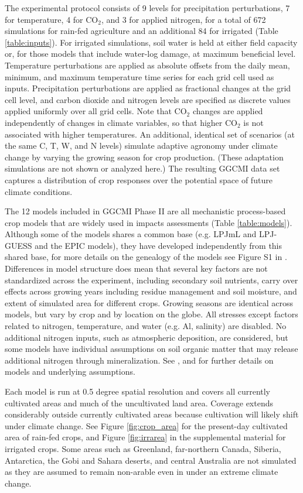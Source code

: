 \documentclass[preprint, 5p, times, twocolumn]{elsarticle}
\begin{document}
The experimental protocol consists of 9 levels for precipitation perturbations, 7 for temperature, 4 for CO$_2$, and 3 for applied nitrogen, for a total of 672 simulations for rain-fed agriculture and an additional 84 for irrigated (Table \ref{table:inputs}). For irrigated simulations, soil water is held at either field capacity or, for those models that include water-log damage, at maximum beneficial level.  Temperature perturbations are applied as absolute offsets from the daily mean, minimum, and maximum temperature time series for each grid cell used as inputs. Precipitation perturbations are applied as fractional changes at the grid cell level, and carbon dioxide and nitrogen levels are specified as discrete values applied uniformly over all grid cells. Note that CO$_2$ changes are applied independently of changes in climate variables, so that higher CO$_2$ is not associated with higher temperatures. An additional, identical set of scenarios (at the same C, T, W, and N levels) simulate adaptive agronomy under climate change by varying the growing season for crop production. (These adaptation simulations are not shown or analyzed here.) The resulting GGCMI data set captures a distribution of crop responses over the potential space of future climate conditions.

The 12 models included in GGCMI Phase II are all mechanistic process-based crop models that are widely used in impacts assessments (Table \ref{table:models}). Although some of the models shares a common base (e.g. LPJmL and LPJ-GUESS and the EPIC models), they have developed independently from this shared base, for more details on the genealogy of the models see Figure S1 in \citet{Rosenzweig2014}. Differences in model structure does mean that several key factors are not standardized across the experiment, including secondary soil nutrients, carry over effects across growing years including residue management and soil moisture, and extent of simulated area for different crops. Growing seasons are identical across models, but vary by crop and by location on the globe. All stresses except factors related to nitrogen, temperature, and water (e.g. Al, salinity) are disabled. No additional nitrogen inputs, such as atmospheric deposition, are considered, but some models have individual assumptions on soil organic matter that may release additional nitrogen through mineralization. See \citet{Rosenzweig2014},  \citet{Elliott2015} and \citet{muller_global_2017} for further details on models and underlying assumptions.

Each model is run at 0.5 degree spatial resolution and covers all currently cultivated areas and much of the uncultivated land area.  Coverage extends considerably outside currently cultivated areas because cultivation will likely shift under climate change. See Figure \ref{fig:crop_area} for the present-day cultivated area of rain-fed crops, and Figure \ref{fig:irrarea} in the supplemental material for irrigated crops. Some areas such as Greenland, far-northern Canada, Siberia, Antarctica, the Gobi and Sahara deserts, and central Australia are not simulated as they are assumed to remain non-arable even in under an extreme climate change.  
\end{document}
